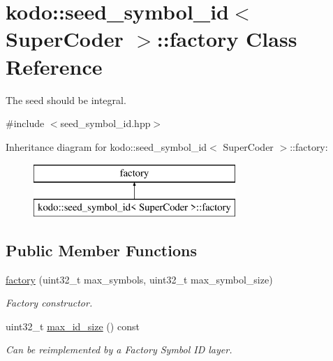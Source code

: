 \hypertarget{classkodo_1_1seed__symbol__id_1_1factory}{\section{kodo\-:\-:seed\-\_\-symbol\-\_\-id$<$ Super\-Coder $>$\-:\-:factory Class Reference}
\label{classkodo_1_1seed__symbol__id_1_1factory}
}


The seed should be integral.  




{\ttfamily \#include $<$seed\-\_\-symbol\-\_\-id.\-hpp$>$}

Inheritance diagram for kodo\-:\-:seed\-\_\-symbol\-\_\-id$<$ Super\-Coder $>$\-:\-:factory\-:\begin{figure}[H]
\begin{center}
\leavevmode
\includegraphics[height=2.000000cm]{classkodo_1_1seed__symbol__id_1_1factory}
\end{center}
\end{figure}
\subsection*{Public Member Functions}
\begin{DoxyCompactItemize}
\item 
\hyperlink{classkodo_1_1seed__symbol__id_1_1factory_a869306a12f0bd90c45b620e5003baf09}{factory} (uint32\-\_\-t max\-\_\-symbols, uint32\-\_\-t max\-\_\-symbol\-\_\-size)
\begin{DoxyCompactList}\small\item\em Factory constructor. \end{DoxyCompactList}\item 
uint32\-\_\-t \hyperlink{classkodo_1_1seed__symbol__id_1_1factory_a279694ee0e01a7c68bde82d5bf19d2d2}{max\-\_\-id\-\_\-size} () const 
\begin{DoxyCompactList}\small\item\em Can be reimplemented by a Factory Symbol I\-D layer. \end{DoxyCompactList}\end{DoxyCompactItemize}


